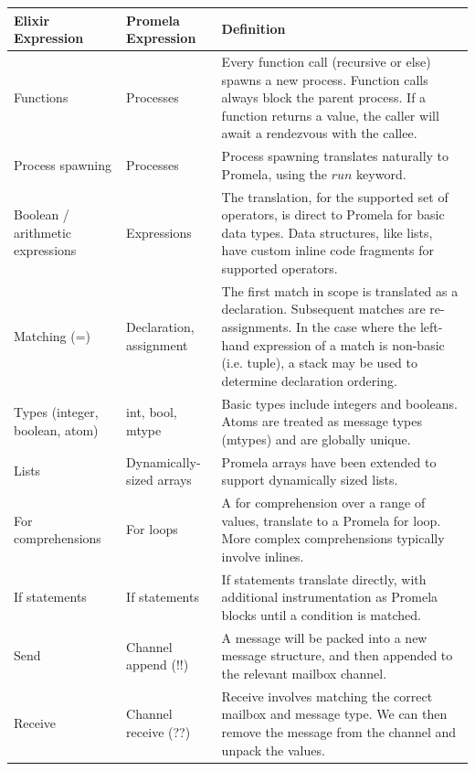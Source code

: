 \begin{longtable}{|>{\raggedright\arraybackslash}p{4cm}|>{\raggedright\arraybackslash}p{4cm}|>{\raggedright\arraybackslash}p{6cm}|}
    \hline
        \textbf{Elixir Expression} & \textbf{Promela Expression} & \textbf{Definition} \\
        \hline
        Functions & Processes & Every function call (recursive or else) spawns a new process. Function calls always block the parent process. If a function returns a value, the caller will await a rendezvous with the callee. \\
        \hline
        Process spawning & Processes & Process spawning translates naturally to Promela, using the $run$ keyword. \\
        \hline
        Boolean / arithmetic expressions & Expressions & The translation, for the supported set of operators, is direct to Promela for basic data types. Data structures, like lists, have custom inline code fragments for supported operators. \\
        \hline
        Matching (=) & Declaration, assignment & The first match in scope is translated as a declaration. Subsequent matches are re-assignments. In the case where the left-hand expression of a match is non-basic (i.e. tuple), a stack may be used to determine declaration ordering. \\
        \hline
        Types (integer, boolean, atom) & int, bool, mtype & Basic types include integers and booleans. Atoms are treated as message types (mtypes) and are globally unique. \\
        \hline
        Lists & Dynamically-sized arrays & Promela arrays have been extended to support dynamically sized lists. \\
        \hline
        For comprehensions & For loops &  A for comprehension over a range of values, translate to a Promela for loop. More complex comprehensions typically involve inlines. \\
        \hline
        If statements & If statements & If statements translate directly, with additional instrumentation as Promela blocks until a condition is matched. \\
        \hline
        Send & Channel append (!!) & A message will be packed into a new message structure, and then appended to the relevant mailbox channel. \\
        \hline
        Receive & Channel receive (??) & Receive involves matching the correct mailbox and message type. We can then remove the message from the channel and unpack the values. \\

\end{longtable}
